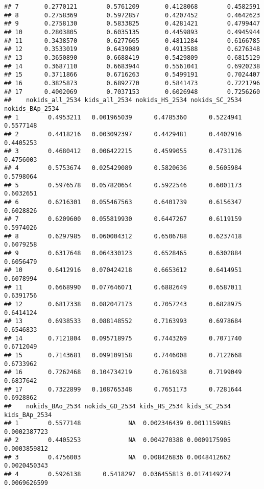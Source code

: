 \documentclass[
]{article}
\begin{document}
\begin{verbatim}
## 7       0.2770121        0.5761209       0.4128068        0.4582591
## 8       0.2758369        0.5972857       0.4207452        0.4642623
## 9       0.2758130        0.5833825       0.4281421        0.4799447
## 10      0.2803805        0.6035135       0.4459893        0.4945944
## 11      0.3438570        0.6277665       0.4811284        0.6166785
## 12      0.3533019        0.6439089       0.4913588        0.6276348
## 13      0.3650890        0.6688419       0.5429809        0.6815129
## 14      0.3687110        0.6683944       0.5561041        0.6920238
## 15      0.3711866        0.6716263       0.5499191        0.7024407
## 16      0.3825873        0.6892770       0.5841473        0.7221796
## 17      0.4002069        0.7037153       0.6026948        0.7256260
##    nokids_all_2534 kids_all_2534 nokids_HS_2534 nokids_SC_2534 nokids_BAp_2534
## 1        0.4953211   0.001965039      0.4785360      0.5224941       0.5577148
## 2        0.4418216   0.003092397      0.4429481      0.4402916       0.4405253
## 3        0.4680412   0.006422215      0.4599055      0.4731126       0.4756003
## 4        0.5753674   0.025429089      0.5820636      0.5605984       0.5798064
## 5        0.5976578   0.057820654      0.5922546      0.6001173       0.6032651
## 6        0.6216301   0.055467563      0.6401739      0.6156347       0.6028826
## 7        0.6209600   0.055819930      0.6447267      0.6119159       0.5974026
## 8        0.6297985   0.060004312      0.6506788      0.6237418       0.6079258
## 9        0.6317648   0.064330123      0.6528465      0.6302884       0.6056479
## 10       0.6412916   0.070424218      0.6653612      0.6414951       0.6078994
## 11       0.6668990   0.077646071      0.6882649      0.6587011       0.6391756
## 12       0.6817338   0.082047173      0.7057243      0.6828975       0.6414124
## 13       0.6938533   0.088148552      0.7163993      0.6978684       0.6546833
## 14       0.7121804   0.095718975      0.7443269      0.7071740       0.6712049
## 15       0.7143681   0.099109158      0.7446008      0.7122668       0.6733962
## 16       0.7262468   0.104734219      0.7616938      0.7199049       0.6837642
## 17       0.7322899   0.108765348      0.7651173      0.7281644       0.6928862
##    nokids_BAo_2534 nokids_GD_2534 kids_HS_2534 kids_SC_2534 kids_BAp_2534
## 1        0.5577148             NA  0.002346439 0.0011159985  0.0002387723
## 2        0.4405253             NA  0.004270388 0.0009175905  0.0003859812
## 3        0.4756003             NA  0.008426836 0.0048412662  0.0020450343
## 4        0.5926138      0.5418297  0.036455813 0.0174149274  0.0069626599

\end{verbatim}
\end{document}
